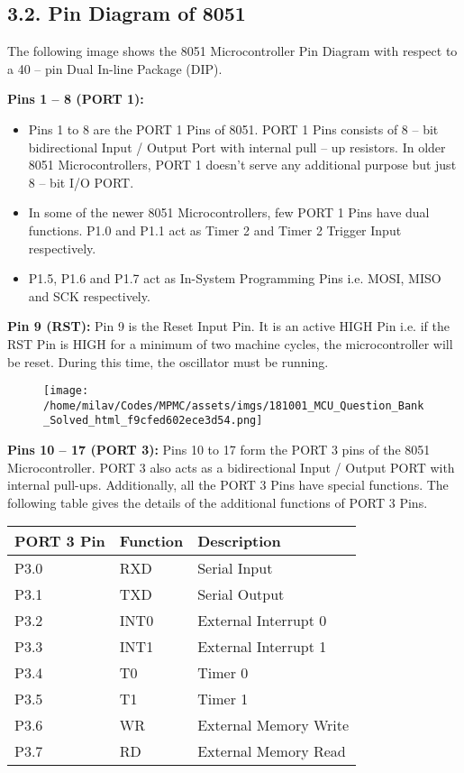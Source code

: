 \documentclass[
]{article}
\begin{document}
\hypertarget{32-pin-diagram-of-8051}{%
\subsection{3.2. Pin Diagram of 8051}\label{32-pin-diagram-of-8051}}

The following image shows the 8051 Microcontroller Pin Diagram with
respect to a 40 -- pin Dual In-line Package (DIP).

\textbf{Pins 1 -- 8 (PORT 1):}

\begin{itemize}
\item
  Pins 1 to 8 are the PORT 1 Pins of 8051. PORT 1 Pins consists of 8 --
  bit bidirectional Input / Output Port with internal pull -- up
  resistors. In older 8051 Microcontrollers, PORT 1 doesn't serve any
  additional purpose but just 8 -- bit I/O PORT.
\item
  In some of the newer 8051 Microcontrollers, few PORT 1 Pins have dual
  functions. P1.0 and P1.1 act as Timer 2 and Timer 2 Trigger Input
  respectively.
\item
  P1.5, P1.6 and P1.7 act as In-System Programming Pins i.e. MOSI, MISO
  and SCK respectively.
\end{itemize}

\textbf{Pin 9 (RST):} Pin 9 is the Reset Input Pin. It is an active HIGH
Pin i.e. if the RST Pin is HIGH for a minimum of two machine cycles, the
microcontroller will be reset. During this time, the oscillator must be
running.

\begin{figure}
\centering
\texttt{[image: /home/milav/Codes/MPMC/assets/imgs/181001\_MCU\_Question\_Bank\_Solved\_html\_f9cfed602ece3d54.png]}
\caption{}
\end{figure}

\textbf{Pins 10 -- 17 (PORT 3):} Pins 10 to 17 form the PORT 3 pins of
the 8051 Microcontroller. PORT 3 also acts as a bidirectional Input /
Output PORT with internal pull-ups. Additionally, all the PORT 3 Pins
have special functions. The following table gives the details of the
additional functions of PORT 3 Pins.

\begin{longtable}[]{@{}lll@{}}
\toprule
PORT 3 Pin & Function & Description \\
\midrule
\endhead
P3.0 & RXD & Serial Input \\
P3.1 & TXD & Serial Output \\
P3.2 & INT0 & External Interrupt 0 \\
P3.3 & INT1 & External Interrupt 1 \\
P3.4 & T0 & Timer 0 \\
P3.5 & T1 & Timer 1 \\
P3.6 & WR & External Memory Write \\
P3.7 & RD & External Memory Read \\
\bottomrule
\end{longtable}
\end{document}
